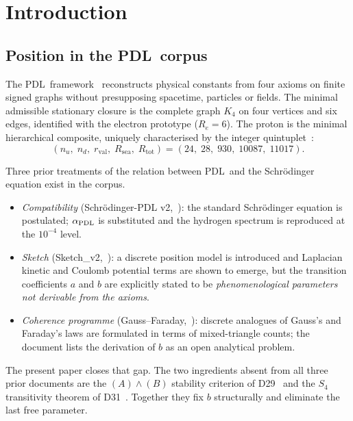 \documentclass[11pt,a4paper]{article}
\theoremstyle{definition}
\newcommand{\PDL}{\textnormal{PDL}}
\newcommand{\Rsea}{R_{\mathrm{sea}}}
\newcommand{\Rtot}{R_{\mathrm{tot}}}
\newcommand{\rval}{r_{\mathrm{val}}}
\newcommand{\Ree}{R_e}
\newcommand{\aPDL}{\alpha_{\PDL}}
\begin{document}
\newpage
\tableofcontents

\section{Introduction}
\label{sec:intro}

\subsection{Position in the \PDL\ corpus}

The \PDL\ framework~\cite{PDL_Main_2026,PDL_Intro_2026} reconstructs physical constants from four axioms on finite signed graphs without presupposing spacetime, particles or fields. The minimal admissible stationary closure is the complete graph $K_4$ on four vertices and six edges, identified with the electron prototype ($\Ree = 6$). The proton is the minimal hierarchical composite, uniquely characterised by the integer quintuplet~\cite{Combinatorial_Proton_v2_2026}:
\begin{equation}
(n_u,\; n_d,\; \rval,\; \Rsea,\; \Rtot) = (24,\; 28,\; 930,\; 10087,\; 11017).
\label{eq:quintuplet}
\end{equation}

Three prior treatments of the relation between \PDL\ and the Schr\"odinger equation exist in the corpus.
\begin{itemize}
\item \emph{Compatibility} (Schr\"odinger-PDL v2,~\cite{Schrodinger_PDL_2026}): the standard Schr\"odinger equation is postulated; $\aPDL$ is substituted and the hydrogen spectrum is reproduced at the $10^{-4}$ level.
\item \emph{Sketch} (Sketch\_v2,~\cite{Schrodinger_Sketch_2026}): a discrete position model is introduced and Laplacian kinetic and Coulomb potential terms are shown to emerge, but the transition coefficients $a$ and $b$ are explicitly stated to be \emph{phenomenological parameters not derivable from the axioms}.
\item \emph{Coherence programme} (Gauss--Faraday,~\cite{Gauss_Faraday_PDL_2026}): discrete analogues of Gauss's and Faraday's laws are formulated in terms of mixed-triangle counts; the document lists the derivation of $b$ as an open analytical problem.
\end{itemize}

The present paper closes that gap. The two ingredients absent from all three prior documents are the $(A)\wedge(B)$ stability criterion of D29~\cite{PDL_D29_2026} and the $S_4$ transitivity theorem of D31~\cite{PDL_D31_2026}. Together they fix $b$ structurally and eliminate the last free parameter.
\end{document}
